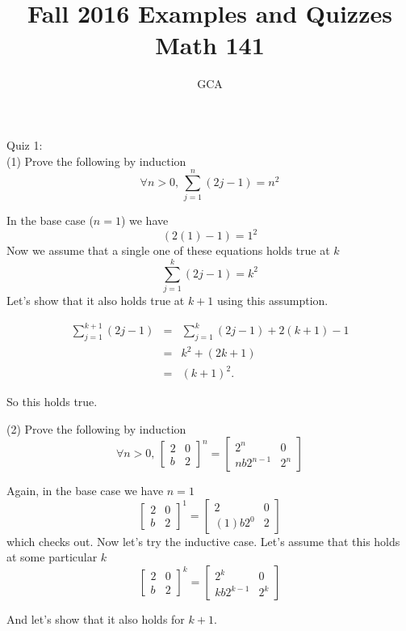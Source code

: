 \documentclass{amsart}
\title{Fall 2016 Examples and Quizzes Math 141}
\author{GCA}
\theoremstyle{definition}
\theoremstyle{remark}
\numberwithin{equation}{section}
\begin{document}
\maketitle

Quiz 1:\\
(1) Prove the following by induction
\[
\forall n>0,\hspace{2pt} \sum_{j=1}^{n}(2j-1) = n^2
\]

In the base case ($n=1$) we have
\[
(2(1)-1) = 1^2
\]
Now we assume that a single one of these equations holds true at $k$
\[
\sum_{j=1}^{k} (2j-1) = k^2
\]
Let's show that it also holds true at $k+1$ using this assumption.

\begin{eqnarray}
\sum_{j=1}^{k+1}(2j-1) & = & \sum_{j=1}^{k}(2j-1) + 2(k+1)-1\nonumber\\
& = & k^2 + (2k+1)\nonumber\\
& = & (k+1)^2.
\end{eqnarray}

So this holds true.

\vspace{1in}

(2) Prove the following by induction
\[
\forall n>0, \hspace{2pt}
\begin{bmatrix}
2 & 0 \\
b & 2
\end{bmatrix}^n = 
\begin{bmatrix}
2^n & 0\\
nb2^{n-1} & 2^n
\end{bmatrix}
\]


Again, in the base case we have $n=1$
\[
\begin{bmatrix}
2 & 0 \\
b & 2
\end{bmatrix}^1 =
\begin{bmatrix}
2 & 0 \\
(1)b2^0 & 2
\end{bmatrix}   
\]
which checks out. Now let's try the inductive case.  Let's assume that this holds at some particular $k$ 
\[
\begin{bmatrix}
2 & 0 \\
b & 2
\end{bmatrix}^k = 
\begin{bmatrix}
2^k & 0\\
kb2^{k-1} & 2^k
\end{bmatrix}
\]

And let's show that it also holds for $k+1$.
\end{document}
